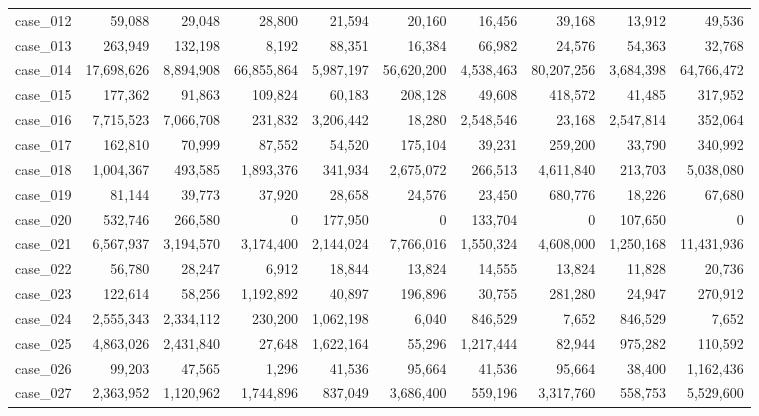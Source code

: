 \begin{footnotesize}
\begin{longtable}{l r rr rr rr rr}
case\_012 & 59{,}088 & 29{,}048 & 28{,}800 & 21{,}594 & 20{,}160 & 16{,}456 & 39{,}168 & 13{,}912 & 49{,}536 \\
case\_013 & 263{,}949 & 132{,}198 & 8{,}192 & 88{,}351 & 16{,}384 & 66{,}982 & 24{,}576 & 54{,}363 & 32{,}768 \\
case\_014 & 17{,}698{,}626 & 8{,}894{,}908 & 66{,}855{,}864 & 5{,}987{,}197 & 56{,}620{,}200 & 4{,}538{,}463 & 80{,}207{,}256 & 3{,}684{,}398 & 64{,}766{,}472 \\
case\_015 & 177{,}362 & 91{,}863 & 109{,}824 & 60{,}183 & 208{,}128 & 49{,}608 & 418{,}572 & 41{,}485 & 317{,}952 \\
case\_016 & 7{,}715{,}523 & 7{,}066{,}708 & 231{,}832 & 3{,}206{,}442 & 18{,}280 & 2{,}548{,}546 & 23{,}168 & 2{,}547{,}814 & 352{,}064 \\
case\_017 & 162{,}810 & 70{,}999 & 87{,}552 & 54{,}520 & 175{,}104 & 39{,}231 & 259{,}200 & 33{,}790 & 340{,}992 \\
case\_018 & 1{,}004{,}367 & 493{,}585 & 1{,}893{,}376 & 341{,}934 & 2{,}675{,}072 & 266{,}513 & 4{,}611{,}840 & 213{,}703 & 5{,}038{,}080 \\
case\_019 & 81{,}144 & 39{,}773 & 37{,}920 & 28{,}658 & 24{,}576 & 23{,}450 & 680{,}776 & 18{,}226 & 67{,}680 \\
case\_020 & 532{,}746 & 266{,}580 & 0 & 177{,}950 & 0 & 133{,}704 & 0 & 107{,}650 & 0 \\
case\_021 & 6{,}567{,}937 & 3{,}194{,}570 & 3{,}174{,}400 & 2{,}144{,}024 & 7{,}766{,}016 & 1{,}550{,}324 & 4{,}608{,}000 & 1{,}250{,}168 & 11{,}431{,}936 \\
case\_022 & 56{,}780 & 28{,}247 & 6{,}912 & 18{,}844 & 13{,}824 & 14{,}555 & 13{,}824 & 11{,}828 & 20{,}736 \\
case\_023 & 122{,}614 & 58{,}256 & 1{,}192{,}892 & 40{,}897 & 196{,}896 & 30{,}755 & 281{,}280 & 24{,}947 & 270{,}912 \\
case\_024 & 2{,}555{,}343 & 2{,}334{,}112 & 230{,}200 & 1{,}062{,}198 & 6{,}040 & 846{,}529 & 7{,}652 & 846{,}529 & 7{,}652 \\
case\_025 & 4{,}863{,}026 & 2{,}431{,}840 & 27{,}648 & 1{,}622{,}164 & 55{,}296 & 1{,}217{,}444 & 82{,}944 & 975{,}282 & 110{,}592 \\
case\_026 & 99{,}203 & 47{,}565 & 1{,}296 & 41{,}536 & 95{,}664 & 41{,}536 & 95{,}664 & 38{,}400 & 1{,}162{,}436 \\
case\_027 & 2{,}363{,}952 & 1{,}120{,}962 & 1{,}744{,}896 & 837{,}049 & 3{,}686{,}400 & 559{,}196 & 3{,}317{,}760 & 558{,}753 & 5{,}529{,}600 \\

\end{longtable}
\end{footnotesize}
